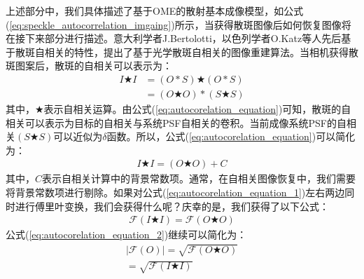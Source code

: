 上述部分中，我们具体描述了基于OME的散射基本成像模型，如公式(\ref{eq:speckle_autocorrelation_imgaing})所示，当获得散斑图像后如何恢复图像将在接下来部分进行描述。意大利学者J.Bertolotti，以色列学者O.Katz等人先后基于散斑自相关的特性，提出了基于光学散斑自相关的图像重建算法。当相机获得散斑图案后，散斑的自相关可以表示为：
\begin{equation}
\begin{aligned}
    I \bigstar I  &= (O*S) \bigstar (O*S) \\
		              &=  (O \bigstar O)*(S \bigstar S)
\end{aligned}
\label{eq:autocorelation_equation}
\end{equation}
其中，$\bigstar$表示自相关运算。由公式(\ref{eq:autocorelation_equation})可知，散斑的自相关可以表示为目标的自相关与系统PSF自相关的卷积。当前成像系统PSF的自相关$(S \bigstar S)$可以近似为$\delta$函数。所以，公式(\ref{eq:autocorelation_equation})可以简化为：
\begin{equation}
\begin{aligned}
    I \bigstar I  = (O \bigstar O)+C
\end{aligned}
\label{eq:autocorelation_equation_1}
\end{equation}
其中，$C$表示自相关计算中的背景常数项。通常，在自相关图像恢复中，我们需要将背景常数项进行剔除。如果对公式(\ref{eq:autocorelation_equation_1})左右两边同时进行傅里叶变换，我们会获得什么呢？庆幸的是，我们获得了以下公式：
\begin{equation}
\begin{aligned}
    \mathcal{F}(I \bigstar I)  = \mathcal{F}(O \bigstar O)
\end{aligned}
\label{eq:autocorelation_equation_2}
\end{equation}
公式(\ref{eq:autocorelation_equation_2})继续可以简化为：
\begin{equation}
\begin{aligned}
    \mid \mathcal{F}(O) \mid = \sqrt{\mathcal{F}(O \bigstar O)}\\
		               = \sqrt{\mathcal{F}(I \bigstar I)}
\end{aligned}
\label{eq:autocorelation_equation_3}
\end{equation}

